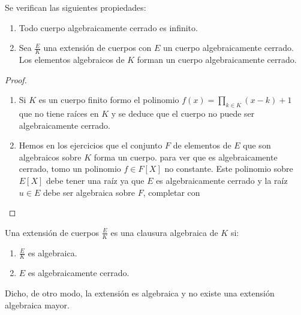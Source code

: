 \begin{proposition}
Se verifican las siguientes propiedades:

\begin{enumerate}
\item Todo cuerpo algebraicamente cerrado es infinito. 
\item Sea $\frac{E}{K}$ una extensión de cuerpos con $E$ un cuerpo algebraicamente cerrado. Los elementos algebraicos de $K$ forman un cuerpo algebraicamente cerrado. 
\end{enumerate}
\end{proposition}
\begin{proof}
\begin{enumerate}
Veamos cada una de las propiedades:

\item Si $K$ es un cuerpo finito formo el polinomio $f(x) = \prod_{k \in K} (x-k) + 1$ que no tiene raíces en $K$ y se deduce que el cuerpo no puede ser algebraicamente cerrado. 
\item Hemos en los ejercicios que el conjunto $F$ de elementos de $E$ que son algebraicos sobre $K$ forma un cuerpo. para ver que es algebraicamente cerrado, tomo un polinomio $f \in F[X]$ no constante. Este polinomio sobre $E[X]$ debe tener una raíz ya que $E$ es algebraicamente cerrado y la raíz $u \in E$ debe ser algebraica sobre $F$, completar con \cite{link4}
\end{enumerate}

\end{proof}

\begin{definition}
Una extensión de cuerpos $\frac{E}{K}$ es una clausura algebraica de $K$ si:

\begin{enumerate}
\item $\frac{E}{K}$ es algebraica. 
\item $E$ es algebraicamente cerrado. 
\end{enumerate}

Dicho, de otro modo, la extensión es algebraica y no existe una extensión algebraica mayor. 
\end{definition}


